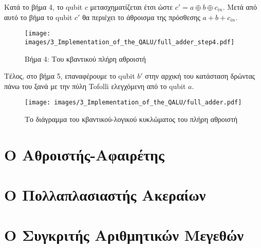 Κατά το βήμα 4, το qubit $c$ μετασχηματίζεται έτσι ώστε $c' = a \oplus b \oplus c_{in}$.
Μετά από αυτό το βήμα το qubit $c'$ θα περιέχει το άθροισμα της πρόσθεσης $a + b + c_{in}$.

\begin{figure}[!ht]
  \centering
  \texttt{[image: images/3\_Implementation\_of\_the\_QALU/full\_adder\_step4.pdf]}
  \label{fig:17}
  \caption{Βήμα 4: Του κβαντικού πλήρη αθροιστή}
\end{figure}

Τέλος, στο βήμα 5, επαναφέρουμε το qubit $b'$ στην αρχική του κατάσταση δρώντας πάνω του
ξανά με την πύλη Tofolli ελεγχόμενη από το qubit $a$.

\begin{figure}[!ht]
  \centering
  \texttt{[image: images/3\_Implementation\_of\_the\_QALU/full\_adder.pdf]}
  \label{fig:18}
  \caption{Το διάγραμμα του κβαντικού-λογικού κυκλώματος του πλήρη αθροιστή}
\end{figure}

\section{Ο Αθροιστής-Αφαιρέτης}
\section{Ο Πολλαπλασιαστής Ακεραίων}
\section{Ο Συγκριτής Αριθμητικών Μεγεθών}